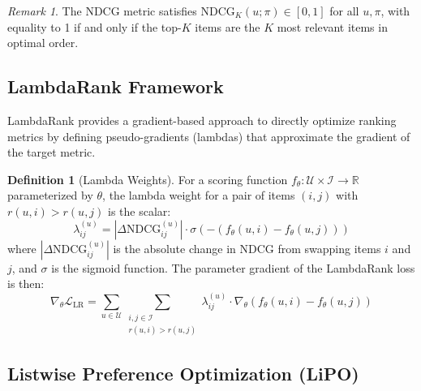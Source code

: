 \documentclass[11pt,a4paper]{article}
\theoremstyle{definition}
\newtheorem{definition}{Definition}[section]
\theoremstyle{plain}
\theoremstyle{remark}
\newtheorem{remark}{Remark}[section]
\newcommand{\R}{\mathbb{R}}
\newcommand{\NDCG}{\mathrm{NDCG}}
\begin{document}
\begin{remark}
The NDCG metric satisfies $\NDCG_K(u; \pi) \in [0, 1]$ for all $u, \pi$, with equality to 1 if and only if the top-$K$ items are the $K$ most relevant items in optimal order.
\end{remark}

\subsection{LambdaRank Framework}
\label{subsec:lambdarank}

LambdaRank \cite{burges2010ranknet} provides a gradient-based approach to directly optimize ranking metrics by defining pseudo-gradients (lambdas) that approximate the gradient of the target metric.

\begin{definition}[Lambda Weights]
\label{def:lambda}
For a scoring function $f_\theta: \mathcal{U} \times \mathcal{I} \rightarrow \R$ parameterized by $\theta$, the lambda weight for a pair of items $(i, j)$ with $r(u, i) > r(u, j)$ is the scalar:
\begin{equation}
    \lambda_{ij}^{(u)} = |\Delta \NDCG_{ij}^{(u)}| \cdot \sigma\!\left(-(f_\theta(u, i) - f_\theta(u, j))\right)
\end{equation}
where $|\Delta \NDCG_{ij}^{(u)}|$ is the absolute change in NDCG from swapping items $i$ and $j$, and $\sigma$ is the sigmoid function. The parameter gradient of the LambdaRank loss is then:
\begin{equation}
    \nabla_\theta \mathcal{L}_{\text{LR}} = \sum_{u \in \mathcal{U}} \sum_{\substack{i, j \in \mathcal{I} \\ r(u,i) > r(u,j)}} \lambda_{ij}^{(u)} \cdot \nabla_\theta(f_\theta(u, i) - f_\theta(u, j))
\end{equation}
\end{definition}


\subsection{Listwise Preference Optimization (LiPO)}
\label{subsec:lipo}
\end{document}
